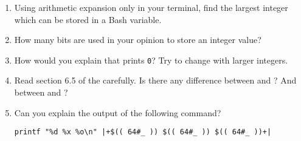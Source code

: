 
    \vspace{-5mm}
    \begin{enumerate}
        \item Using arithmetic expansion only in your terminal, find the largest integer which can be stored in a Bash variable.
        \item How many bits are used in your opinion to store an integer value?
        \item How would you explain that  prints \texttt{0}? Try to change  with larger integers.
        \item Read section 6.5 of the  carefully.
              Is there any difference between  and ?
              And between  and ?
        \item Can you explain the output of the following command?
              \begin{lstlisting}[style=MyBash]
                  printf "%d %x %o\n" |+$(( 64#_ )) $(( 64#_ )) $(( 64#_ ))+|
              \end{lstlisting}
    \end{enumerate}
    \vspace{-5mm}
\EndExercise[Black]

